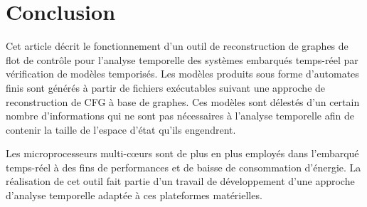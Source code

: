 \section{Conclusion}
\label{sec:conclusion}


  Cet article décrit le fonctionnement d'un outil de reconstruction de graphes
  de flot de contrôle pour l'analyse temporelle des systèmes embarqués
  temps-réel par vérification de modèles temporisés. Les modèles produits sous
  forme d'automates finis sont générés à partir de fichiers exécutables suivant
  une approche de reconstruction de CFG à base de graphes. Ces modèles sont
  délestés d'un certain nombre d'informations qui ne sont pas nécessaires à
  l'analyse temporelle afin de contenir la taille de l'espace d'état qu'ils
  engendrent.


  Les microprocesseurs multi-c{\oe}urs sont de plus en plus employés dans
  l'embarqué temps-réel à des fins de performances et de baisse de consommation
  d'énergie. La réalisation de cet outil fait partie d'un travail de
  développement d'une approche d'analyse temporelle adaptée à ces plateformes
  matérielles.

